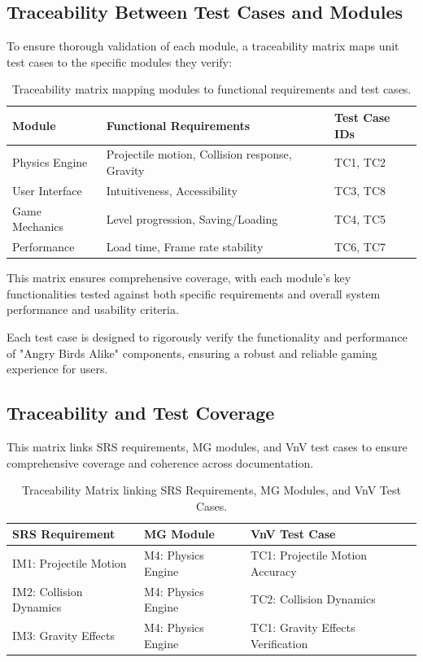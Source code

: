 \documentclass[12pt]{article}
\begin{document}
\subsection{Traceability Between Test Cases and Modules}

To ensure thorough validation of each module, a traceability matrix maps unit test cases to the specific modules they verify:

\begin{table}[H]
\centering
\begin{tabular}{|l|l|l|}
\hline
\textbf{Module} & \textbf{Functional Requirements} & \textbf{Test Case IDs} \\
\hline
Physics Engine & Projectile motion, Collision response, Gravity & TC1, TC2 \\
User Interface & Intuitiveness, Accessibility & TC3, TC8 \\
Game Mechanics & Level progression, Saving/Loading & TC4, TC5 \\
Performance & Load time, Frame rate stability & TC6, TC7 \\
\hline
\end{tabular}
\caption{Traceability matrix mapping modules to functional requirements and test cases.}
\end{table}

This matrix ensures comprehensive coverage, with each module's key functionalities tested against both specific requirements and overall system performance and usability criteria.


Each test case is designed to rigorously verify the functionality and performance of "Angry Birds Alike" components, ensuring a robust and reliable gaming experience for users.

\subsection{Traceability and Test Coverage}
This matrix links SRS requirements, MG modules, and VnV test cases to ensure comprehensive coverage and coherence across documentation.


\begin{table}[H]
\centering
\begin{tabular}{|l|l|l|}
\hline
\textbf{SRS Requirement} & \textbf{MG Module} & \textbf{VnV Test Case} \\
\hline
IM1: Projectile Motion & M4: Physics Engine & TC1: Projectile Motion Accuracy \\
IM2: Collision Dynamics & M4: Physics Engine & TC2: Collision Dynamics \\
IM3: Gravity Effects & M4: Physics Engine & TC1: Gravity Effects Verification \\
\hline
\end{tabular}
\caption{Traceability Matrix linking SRS Requirements, MG Modules, and VnV Test Cases.}
\end{table}
\end{document}
